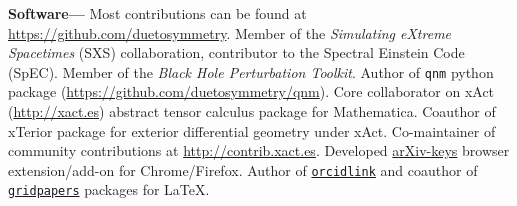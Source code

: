 \documentclass[margin,line]{res}
\begin{document}
\begin{resume}

{\bf Software---}%
Most contributions can be found at \url{https://github.com/duetosymmetry}.
Member of the {\it Simulating eXtreme Spacetimes} (SXS) collaboration,
contributor to the Spectral Einstein Code (SpEC).
Member of the {\it Black Hole Perturbation Toolkit}. Author of
{\tt qnm} python package (\url{https://github.com/duetosymmetry/qnm}).
Core collaborator on {\sc xAct} (\url{http://xact.es}) abstract
tensor calculus package for {\sc  Mathematica}. Coauthor
of {\sc xTerior} package for exterior differential geometry under
{\sc xAct}. Co-maintainer of community contributions at
\url{http://contrib.xact.es}. Developed
\href{https://chrome.google.com/webstore/detail/arxiv-keys/fkjjdlbhliopfhgddlpoggpmpgjfaojd}{arXiv-keys}
browser extension/add-on for Chrome/Firefox.
Author of \href{https://ctan.org/pkg/orcidlink}{\tt orcidlink} and coauthor of \href{https://ctan.org/pkg/gridpapers}{\tt gridpapers} packages for \LaTeX.


\ifx\nopubs\undefined

\else
%
\fi



\newpage{}


\end{resume}
\end{document}
